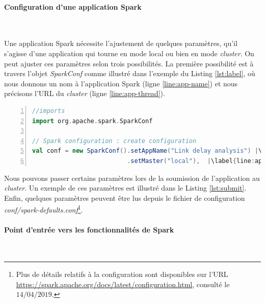 \paragraph{Configuration d'une application  Spark}~

Une application Spark nécessite l'ajustement de quelques paramètres, qu'il s'agisse d'une application qui tourne en mode local ou bien en mode \textit{cluster}. 
 On peut ajuster ces paramètres selon trois possibilités. La première possibilité est à travers l'objet \textit{SparkConf} comme illustré dans l'exemple du Listing \ref{lst:label}, où nous donnons un nom à l'application Spark (ligne \ref{line:app-name}) et nous précisons l'URL du \textit{cluster} (ligne \ref{line:app-thread}). 

\begin{lstlisting}[language=scala,firstnumber=1, caption={Exemple de la configuration d'une application Spark via l'objet SparkConf},label={lst:label}, basicstyle = \footnotesize,escapechar=|,numbers=left,
stepnumber=1,numberstyle=\scriptsize]
//imports
import org.apache.spark.SparkConf

// Spark configuration : create configuration
val conf = new SparkConf().setAppName("Link delay analysis") |\label{line:app-name}|
                          .setMaster("local"),  |\label{line:app-thread}|
\end{lstlisting}

Nous pouvons passer certains paramètres lors de la soumission de l'application au \textit{cluster}.  Un exemple de ces paramètres est illustré dans le Listing \ref{lst:submit}. Enfin, quelques paramètres peuvent être lus depuis le fichier de configuration  \textit{conf/spark-defaults.conf}\footnote{Plus de détails relatifs à la configuration sont disponibles sur l'URL  \url{https://spark.apache.org/docs/latest/configuration.html}, consulté le $14/04/2019$.}. 





\paragraph{Point d'entrée vers les fonctionnalités de Spark}~

